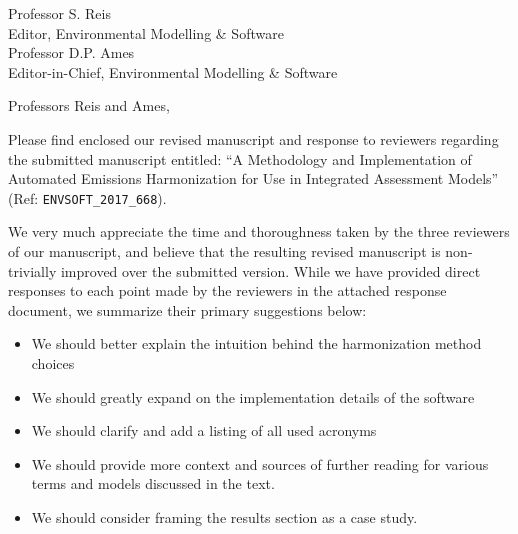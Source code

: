 \documentclass[11pt]{letter} %
\begin{document}

\begin{letter}{
    Professor S. Reis\\
    Editor, Environmental Modelling \& Software\\
    \hfill\break
    Professor D.P. Ames\\
    Editor-in-Chief, Environmental Modelling \& Software\\
  }


\address{Matthew Gidden\\
Laimgrubengasse 17/7\\
Vienna, Austria 1060}



\opening{Professors Reis and Ames,}

Please find enclosed our revised manuscript and response to reviewers regarding
the submitted manuscript entitled: ``A Methodology and Implementation of
Automated Emissions Harmonization for Use in Integrated Assessment Models''
(Ref: \texttt{ENVSOFT\_2017\_668}).

We very much appreciate the time and thoroughness taken by the three reviewers
of our manuscript, and believe that the resulting revised manuscript is
non-trivially improved over the submitted version. While we have provided direct
responses to each point made by the reviewers in the attached response document,
we summarize their primary suggestions below:

\begin{itemize}
\item We should better explain the intuition behind the harmonization method choices
\item We should greatly expand on the implementation details of the software
\item We should clarify and add a listing of all used acronyms
\item We should provide more context and sources of further reading for various terms and models discussed in the text.
\item We should consider framing the results section as a case study.
\end{itemize}


\end{letter}
\end{document}
